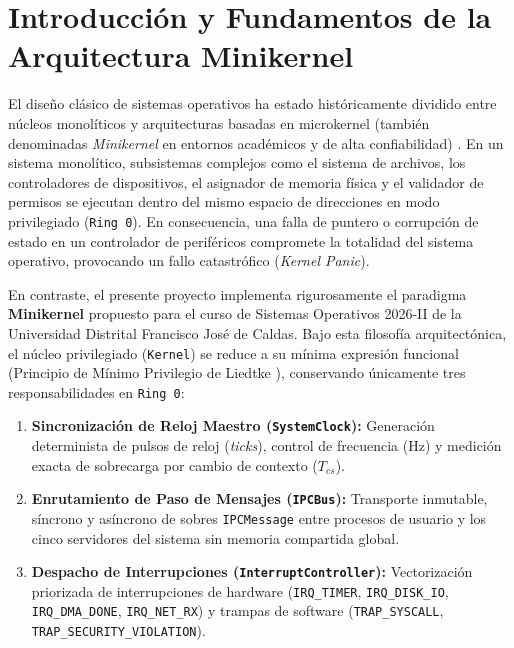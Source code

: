 \documentclass[10pt,twocolumn,letterpaper]{article}
\begin{document}
\section{Introducci\'on y Fundamentos de la Arquitectura Minikernel}

El dise\~no cl\'asico de sistemas operativos ha estado hist\'oricamente dividido entre n\'ucleos monol\'iticos y arquitecturas basadas en microkernel (tambi\'en denominadas \textit{Minikernel} en entornos acad\'emicos y de alta confiabilidad) \cite{tanenbaum2015, silberschatz2018}. En un sistema monol\'itico, subsistemas complejos como el sistema de archivos, los controladores de dispositivos, el asignador de memoria f\'isica y el validador de permisos se ejecutan dentro del mismo espacio de direcciones en modo privilegiado (\texttt{Ring 0}). En consecuencia, una falla de puntero o corrupci\'on de estado en un controlador de perif\'ericos compromete la totalidad del sistema operativo, provocando un fallo catastr\'ofico (\textit{Kernel Panic}).

En contraste, el presente proyecto implementa rigurosamente el paradigma \textbf{Minikernel} propuesto para el curso de Sistemas Operativos 2026-II de la Universidad Distrital Francisco Jos\'e de Caldas. Bajo esta filosof\'ia arquitect\'onica, el n\'ucleo privilegiado (\texttt{Kernel}) se reduce a su m\'inima expresi\'on funcional (Principio de M\'inimo Privilegio de Liedtke \cite{liedtke1995}), conservando \'unicamente tres responsabilidades en \texttt{Ring 0}:
\begin{enumerate}[leftmargin=*,nosep]
  \item \textbf{Sincronizaci\'on de Reloj Maestro (\texttt{SystemClock}):} Generaci\'on determinista de pulsos de reloj (\textit{ticks}), control de frecuencia ($\text{Hz}$) y medici\'on exacta de sobrecarga por cambio de contexto ($T_{cs}$).
  \item \textbf{Enrutamiento de Paso de Mensajes (\texttt{IPCBus}):} Transporte inmutable, s\'incrono y as\'incrono de sobres \texttt{IPCMessage} entre procesos de usuario y los cinco servidores del sistema sin memoria compartida global.
  \item \textbf{Despacho de Interrupciones (\texttt{InterruptController}):} Vectorizaci\'on priorizada de interrupciones de hardware (\texttt{IRQ\_TIMER}, \texttt{IRQ\_DISK\_IO}, \texttt{IRQ\_DMA\_DONE}, \texttt{IRQ\_NET\_RX}) y trampas de software (\texttt{TRAP\_SYSCALL}, \texttt{TRAP\_SECURITY\_VIOLATION}).
\end{enumerate}
\end{document}
